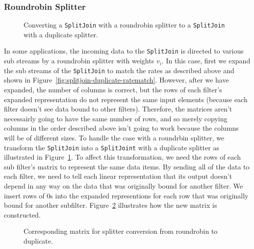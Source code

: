 \subsubsection{Roundrobin Splitter}

\begin{figure}
\center
\epsfxsize=3.0in
\caption{Converting a {\tt SplitJoin} with a roundrobin splitter to a {\tt SplitJoin} with a duplicate splitter.}
\label{fig:splitjoin-roundrobin-to-duplicate}
\end{figure}

In some applications, the incoming data to the {\tt SplitJoin} is directed to various sub streams 
by a roundrobin splitter with weights $v_i$. In this case, first we expand the sub streams of the
{\tt SplitJoin} to match the rates as described above and shown in 
Figure~\ref{fig:splitjoin-duplicate-ratematch}. However, after we have expanded, the number of
columns is correct, but the rows of each filter's expanded representation do not represent the
same input elements (because each filter doesn't see data bound to other filters). Therefore,
the matrices aren't necessairly going to have the same number of rows, and so merely
copying columns in the order described above isn't going to work because the columns will be 
of different sizes. To handle the case with a roundrbin splitter, we transform the {\tt SplitJoin} 
into a {\tt SplitJoint} with a duplicate splitter as illustrated in 
Figure~\ref{fig:splitjoin-roundrobin-to-duplicate}. To affect this transformation, we need the rows
of each sub filter's matrix to represent the same data items. By sending all of the data to each filter,
we need to tell each linear representation that its output doesn't depend in any way on the data that 
was originally bound for another filter. We insert rows of $0$s into the expanded representions
for each row that was originally bound for another subfilter. Figure~\ref{fig:splitjoin-roundrobin-matrix}
illustrates how the new matrix is constructed.

\begin{figure}
\center
\epsfxsize=3.0in
\caption{Corresponding matrix for splitter conversion from roundrobin to duplicate.}
\label{fig:splitjoin-roundrobin-matrix}
\end{figure}
